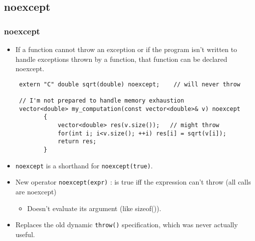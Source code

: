 
\subsection{noexcept}
\begin{frame}[fragile,t]
\frametitle{noexcept}
\begin{itemize}[<+->]
\item If a function cannot throw an exception or if the program isn't
  written to handle exceptions thrown by a function, that function can
  be declared noexcept.
{\scriptsize\begin{verbatim}
 extern "C" double sqrt(double) noexcept;    // will never throw

 // I'm not prepared to handle memory exhaustion
 vector<double> my_computation(const vector<double>& v) noexcept
        {
            vector<double> res(v.size());   // might throw
            for(int i; i<v.size(); ++i) res[i] = sqrt(v[i]);
            return res;
        }
\end{verbatim}
}
\item \texttt{noexcept} is a shorthand for \texttt{noexcept(true)}.
\item New operator \texttt{noexcept(expr)} : is true iff the
  expression can't throw (all calls are noexcept)
  \begin{itemize}
  \item Doesn't evaluate its argument (like sizeof()).
  \end{itemize}
\item Replaces the old dynamic \texttt{throw()} specification, which
  was never actually useful.

\end{itemize}
\end{frame}

